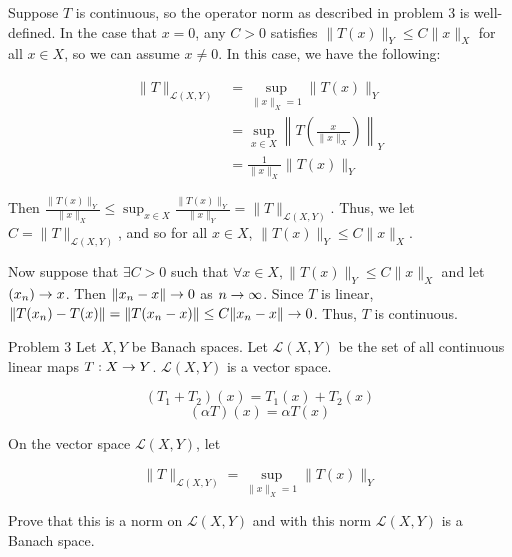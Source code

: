 \documentclass{hmwk}
\begin{document}
\begin{solution}

\pre Suppose $T$ is continuous, so the operator norm as described in problem 3 is well-defined. In the case that $x = 0$, any $C > 0$ satisfies $\|T(x)\|_Y \leq C\|x\|_X$ for all $x \in X$, so we can assume $x \neq 0$. In this case, we have the following: 

\begin{align*}
    \|T\|_{\mathcal{L}(X, Y)} &= \sup_{\|x\|_X = 1} \|T(x)\|_Y \\ 
    &= \sup_{x \in X} \left\|T\left(\frac{x}{\|x\|_X}\right)\right\|_Y \\
    &= \frac{1}{\|x\|_X} \|T(x)\|_Y
\end{align*}

\pre Then $\frac{\|T(x)\|_Y}{\|x\|_X} \leq \sup_{x \in X} \frac{\|T(x)\|_Y}{\|x\|_Y} = \|T\|_{\mathcal{L}(X, Y)}$. Thus, we let $C = \|T\|_{\mathcal{L}(X, Y)}$, and so for all $x \in X$, $\|T(x)\|_Y \leq C\|x\|_X$.

\pre Now suppose that $\exists C > 0$ such that $\forall x \in X, \|T(x)\|_Y \leq C\|x\|_X$ and let $(x_n) \rightarrow x$. Then $\|x_n - x\| \rightarrow 0$ as $n \rightarrow \infty$. Since $T$ is linear, $\|T(x_n) - T(x)\| = \|T(x_n - x)\| \leq C\|x_n - x\| \rightarrow 0$. Thus, $T$ is continuous. 
\end{solution}

\begin{problem}{Problem 3}
Let $X, Y$ be Banach spaces. Let $\mathcal{L}(X, Y)$ be the set of all continuous linear maps $T: X \rightarrow Y$. $\mathcal{L}(X, Y)$ is a vector space. 

$$(T_1 + T_2)(x) = T_1(x) + T_2(x)$$
$$(\alpha T)(x) = \alpha T(x)$$

\noindent On the vector space $\mathcal{L}(X, Y)$, let 

$$\|T\|_{\mathcal{L}(X, Y)} = \sup_{\|x\|_X = 1} \|T(x)\|_Y$$

\noindent Prove that this is a norm on $\mathcal{L}(X, Y)$ and with this norm $\mathcal{L}(X, Y)$ is a Banach space. 
\end{problem}
\end{document}

